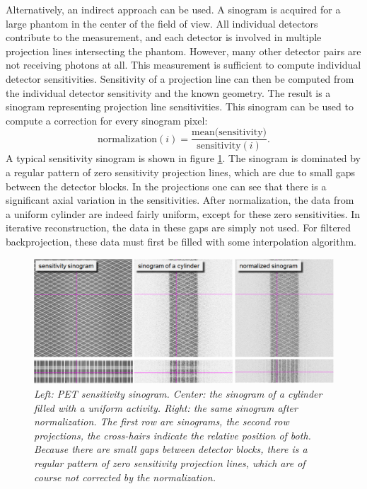 Alternatively, an indirect approach can be used. A sinogram is acquired for a
large phantom in the center of the field of view. All individual detectors
contribute to the measurement, and each detector is involved in multiple
projection lines intersecting the phantom. However, many other detector pairs
are not receiving photons at all. This measurement is sufficient to compute
individual detector sensitivities. Sensitivity of a projection line can then
be computed from the individual detector sensitivity and the known geometry.
The result is a sinogram representing projection line sensitivities. This
sinogram can be used to compute a correction for every sinogram pixel:
\begin{equation}
  \mbox{normalization}(i) = 
    \frac{\mbox{mean(sensitivity)}}{\mbox{sensitivity}(i)}. \label{eq:petnorm}
\end{equation}
A typical sensitivity sinogram is shown in figure
\ref{fig:pet_norm}. The sinogram is dominated by a regular pattern of
zero sensitivity projection lines, which are due to small gaps between
the detector blocks. In the projections one can see that there is a
significant axial variation in the sensitivities. After normalization,
the data from a uniform cylinder are indeed fairly uniform, except for
these zero sensitivities. In iterative reconstruction, the data in
these gaps are simply not used. For filtered backprojection, these
data must first be filled with some interpolation algorithm.
%
\begin{figure}[tb]
\centering
\includegraphics[width=1.0\figbig]{figs/fig_PETsens.pdf}
\caption{\label{fig:pet_norm} \emph{Left: PET sensitivity
    sinogram. Center: the sinogram of a cylinder filled with a uniform
    activity. Right: the same sinogram after normalization. The first
    row are sinograms, the second row projections, the cross-hairs
    indicate the relative position of both. Because there are small
    gaps between detector blocks, there is a regular pattern of zero
    sensitivity projection lines, which are of course not corrected by the
    normalization.}}
\end{figure}


